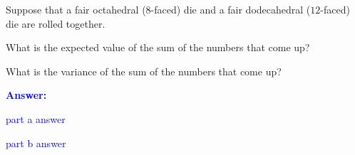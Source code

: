 \item{}
Suppose that a fair octahedral ($8$-faced) die and a fair dodecahedral
($12$-faced) die are rolled together.
\begin{list}{\textbf{.}}{}
\item What is the expected value of the sum of the numbers that come up?
\item What is the variance of the sum of the numbers that come up?
\end{list}
\vskip12pt
\ifanswers
\textcolor{blue}{
\textbf{Answer:}\\[6pt]
\begin{list}{\textbf{.}}{}
\item part a answer
\item part b answer
\end{list}
}
\newpage
\fi
